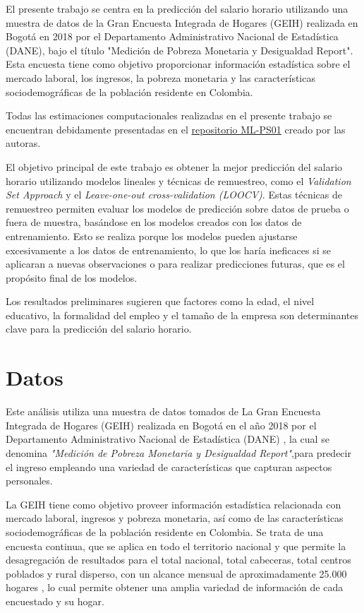 \documentclass[11pt, a4paper]{article}
\begin{document}
El presente trabajo se centra en la predicción del salario horario utilizando una muestra de datos de la Gran Encuesta Integrada de Hogares (GEIH) realizada en Bogotá en 2018 por el Departamento Administrativo Nacional de Estadística (DANE), bajo el título "Medición de Pobreza Monetaria y Desigualdad Report". Esta encuesta tiene como objetivo proporcionar información estadística sobre el mercado laboral, los ingresos, la pobreza monetaria y las características sociodemográficas de la población residente en Colombia.

Todas las estimaciones computacionales realizadas en el presente trabajo se encuentran debidamente presentadas en el \href{https://github.com/Dalila02/ML_PS01}{repositorio ML-PS01} creado por las autoras.

El objetivo principal de este trabajo es obtener la mejor predicción del salario horario utilizando modelos lineales y técnicas de remuestreo, como el \textit{Validation Set Approach} y el \textit{Leave-one-out cross-validation (LOOCV)}. Estas técnicas de remuestreo permiten evaluar los modelos de predicción sobre datos de prueba o fuera de muestra, basándose en los modelos creados con los datos de entrenamiento. Esto se realiza porque los modelos pueden ajustarse excesivamente a los datos de entrenamiento, lo que los haría ineficaces si se aplicaran a nuevas observaciones o para realizar predicciones futuras, que es el propósito final de los modelos.

Los resultados preliminares sugieren que factores como la edad, el nivel educativo, la formalidad del empleo y el tamaño de la empresa son determinantes clave para la predicción del salario horario.

\section{Datos}

Este análisis utiliza una muestra de datos tomados de La Gran Encuesta Integrada de Hogares (GEIH)  realizada en Bogotá en el año 2018 por el Departamento Administrativo Nacional de Estadística (DANE) , la cual se denomina \textit{"Medición de Pobreza Monetaria y Desigualdad Report"},para predecir el ingreso empleando una variedad de características que capturan aspectos personales. 

 La GEIH tiene como objetivo proveer información estadística relacionada con mercado laboral, ingresos y pobreza monetaria, así como de las características sociodemográficas de la población residente en Colombia.  Se trata de una encuesta continua, que se aplica en todo el territorio nacional y que permite la desagregación de resultados para el total nacional, total cabeceras, total centros poblados y rural disperso, con un alcance mensual de aproximadamente 25.000 hogares , lo cual permite obtener una amplia variedad de información de cada encuestado y su hogar.  
\end{document}
